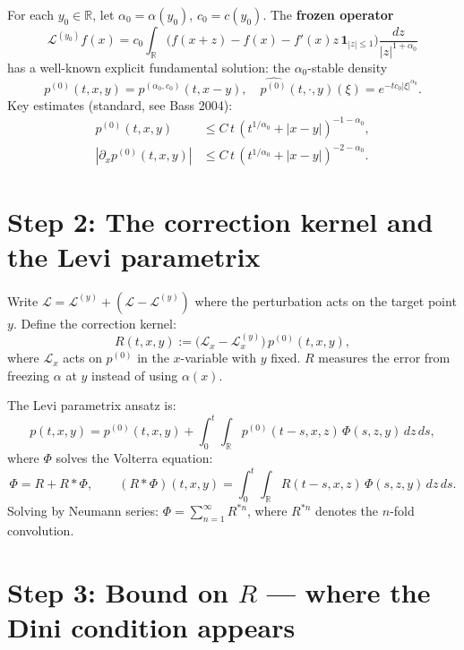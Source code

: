 \documentclass{amsart}
\theoremstyle{definition}
\begin{document}
For each $y_0 \in \mathbb{R}$, let $\alpha_0 = \alpha(y_0)$, $c_0 = c(y_0)$.
The \textbf{frozen operator}
\[
    \mathcal{L}^{(y_0)} f(x)
    = c_0\int_{\mathbb{R}}\bigl(f(x+z)-f(x)-f'(x)z\,\mathbf{1}_{|z|\leq 1}\bigr)
      \frac{dz}{|z|^{1+\alpha_0}}
\]
has a well-known explicit fundamental solution: the $\alpha_0$-stable density
\[
    p^{(0)}(t,x,y)
    = p^{(\alpha_0,c_0)}\!\left(t,x-y\right),
    \quad
    \widehat{p^{(0)}}(t,\cdot,y)(\xi) = e^{-tc_0|\xi|^{\alpha_0}}.
\]
Key estimates (standard, see Bass 2004):
\begin{align}
    p^{(0)}(t,x,y) &\leq C\,t\,(t^{1/\alpha_0}+|x-y|)^{-1-\alpha_0},
    \label{eq:upper} \\
    |\partial_x p^{(0)}(t,x,y)| &\leq C\,t\,
      (t^{1/\alpha_0}+|x-y|)^{-2-\alpha_0}.
    \label{eq:grad}
\end{align}

\section{Step 2: The correction kernel and the Levi parametrix}

Write $\mathcal{L} = \mathcal{L}^{(y)} + (\mathcal{L}-\mathcal{L}^{(y)})$
where the perturbation acts on the target point $y$. Define the correction kernel:
\begin{equation}
    R(t,x,y)
    := \bigl(\mathcal{L}_x - \mathcal{L}^{(y)}_x\bigr)\,p^{(0)}(t,x,y),
    \label{eq:R-def}
\end{equation}
where $\mathcal{L}_x$ acts on $p^{(0)}$ in the $x$-variable with $y$ fixed.
$R$ measures the error from freezing $\alpha$ at $y$ instead of using $\alpha(x)$.

The Levi parametrix ansatz is:
\begin{equation}
    p(t,x,y) = p^{(0)}(t,x,y) + \int_0^t\int_{\mathbb{R}}
                p^{(0)}(t-s,x,z)\,\Phi(s,z,y)\,dz\,ds,
    \label{eq:parametrix}
\end{equation}
where $\Phi$ solves the Volterra equation:
\begin{equation}
    \Phi = R + R \ast \Phi,
    \qquad
    (R \ast \Phi)(t,x,y) = \int_0^t\int_{\mathbb{R}} R(t-s,x,z)\,\Phi(s,z,y)\,dz\,ds.
    \label{eq:volterra}
\end{equation}
Solving by Neumann series: $\Phi = \sum_{n=1}^\infty R^{\ast n}$,
where $R^{\ast n}$ denotes the $n$-fold convolution.

\section{Step 3: Bound on $R$ --- where the Dini condition appears}
\end{document}

